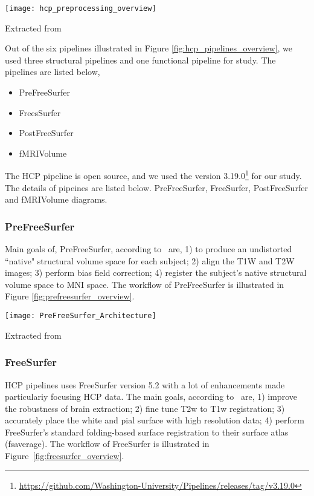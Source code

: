 \begin{center}
   \texttt{[image: hcp\_preprocessing\_overview]}
   \label{fig:hcp_pipelines_overview}
   \caption*{Extracted from \cite{Gla13}}
\end{center}

Out of the six pipelines illustrated in Figure \ref{fig:hcp_pipelines_overview}, we used three structural pipelines and one functional pipeline for study. The pipelines are listed below, 
\begin{itemize}
  \item PreFreeSurfer
  \item FreesSurfer
  \item PostFreeSurfer
  \item fMRIVolume
\end{itemize}

The HCP pipeline is open source, and we used the version 3.19.0\footnote{\url{https://github.com/Washington-University/Pipelines/releases/tag/v3.19.0}} for our study. The details of pipeines are listed below. 
PreFreeSurfer, FreeSurfer, PostFreeSurfer and fMRIVolume diagrams.

\subsubsection{PreFreeSurfer}
Main goals of, PreFreeSurfer, according to~\cite{Gla13} are, 1) to produce an undistorted ``native" structural volume space for each subject; 2) align the T1W and T2W images; 3) perform bias field correction; 4) register the subject's native structural volume space to MNI space. The workflow of PreFreeSurfer is illustrated in Figure \ref{fig:prefreesurfer_overview}.

\begin{center}
  \texttt{[image: PreFreeSurfer\_Architecture]}
  \label{fig:prefreesurfer_overview}
  \caption*{Extracted from \cite{Gla13}}
\end{center}

\subsubsection{FreeSurfer}
HCP pipelines uses FreeSurfer version 5.2 with a lot of enhancements made particulariy focusing HCP data. The main goals, according to~\cite{Gla13} are, 1) improve the robustness of brain extraction; 2) fine tune T2w to T1w registration; 3) accurately place the white and pial surface with high resolution data; 4) perform FreeSurfer's standard folding-based surface registration to their surface atlas (fsaverage). The workflow of FreeSurfer is illustrated in Figure~\ref{fig:freesurfer_overview}.

